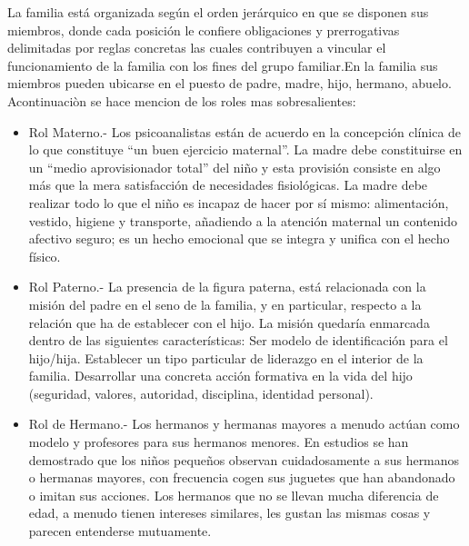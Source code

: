 \documentclass[11pt,letterpaper]{report}
\begin{document}
La familia está organizada según el orden jerárquico en que se disponen sus miembros, donde cada posición le confiere obligaciones y prerrogativas delimitadas por reglas concretas las cuales contribuyen a vincular el funcionamiento de la familia con los fines del grupo familiar.En la familia sus miembros pueden ubicarse en el puesto de padre, madre, hijo, hermano, abuelo. Acontinuaciòn se hace mencion de los roles mas sobresalientes:
		\begin{itemize}
		\item Rol Materno.- Los psicoanalistas están de acuerdo en la concepción clínica de lo que constituye “un buen ejercicio maternal”. La madre debe constituirse en un “medio aprovisionador total” del niño y esta provisión consiste en algo más que la mera satisfacción de necesidades fisiológicas. La madre debe realizar todo lo que el niño es incapaz de hacer por sí mismo: alimentación, vestido, higiene y transporte, añadiendo a la atención maternal un contenido afectivo seguro; es un hecho emocional que se integra y unifica con el hecho físico.
		\item Rol Paterno.- La presencia de la figura paterna, está relacionada con la misión del padre en el seno de la familia, y en particular, respecto a la relación que ha de establecer con el hijo. La misión quedaría enmarcada dentro de las siguientes características:
		\subitem Ser modelo de identificación para el hijo/hija.
		\subitem Establecer un tipo particular de liderazgo en el interior de la familia.
		\subitem Desarrollar una concreta acción formativa en la vida del hijo (seguridad, valores, autoridad, disciplina, identidad personal).
		\item Rol de Hermano.- Los hermanos y hermanas mayores a menudo actúan como modelo y profesores para sus hermanos menores. En estudios se han demostrado que los niños pequeños observan cuidadosamente a sus hermanos o hermanas mayores, con frecuencia cogen sus juguetes que han abandonado o imitan sus acciones. Los hermanos que no se llevan mucha diferencia de edad, a menudo tienen intereses similares, les gustan las mismas cosas y parecen entenderse mutuamente.
		\end{itemize}
\end{document}
